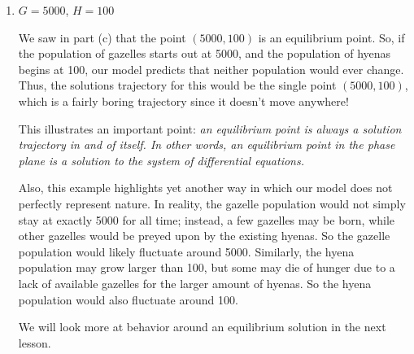 \documentclass[main]{subfiles}
\begin{document}
\begin{enumerate}
\begin{enumerate}
\begin{enumerate}
\begin{solution}
As in the last example, we would need to solve the system of differential equations and find an equation for $H(t)$ in order to determine when the hyena population would die out. If we do, we would have a decreasing exponential function, which cannot be equal to 0 for any time $t$. However, we can determine when the hyena population would be equal to 1, which would give us a good sense of when the population would go extinct. (This highlights another way in which our models are flawed and not perfectly representative of reality.)

\end{solution}



\item $G=5000$, $H=100$

\begin{solution}
We saw in part (c) that the point $(5000,100)$ is an equilibrium point. So, if the population of gazelles starts out at 5000, and the population of hyenas begins at 100, our model predicts that neither population would ever change. Thus, the solutions trajectory for this would be the single point $(5000,100)$, which is a fairly boring trajectory since it doesn't move anywhere! 

This illustrates an important point: \textit{an equilibrium point is always a solution trajectory in and of itself. In other words, an equilibrium point in the phase plane is a solution to the system of differential equations.}

Also, this example highlights yet another way in which our model does not perfectly represent nature. In reality, the gazelle population would not simply stay at exactly 5000 for all time; instead, a few gazelles may be born, while other gazelles would be preyed upon by the existing hyenas. So the gazelle population would likely fluctuate around 5000. Similarly, the hyena population may grow larger than 100, but some may die of hunger due to a lack of available gazelles for the larger amount of hyenas. So the hyena population would also fluctuate around 100. 

We will look more at behavior around an equilibrium solution in the next lesson.

\end{solution}


\end{enumerate}


 \end{enumerate}

\pspace{1in}
 

\end{enumerate}
\end{document}
